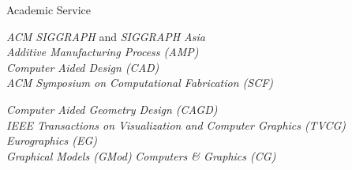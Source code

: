 \begin{rubric}{Academic Service}
\entry*[]
	\begin{minipage}[t]{0.48\textwidth}
		\textit{ACM SIGGRAPH} and \textit{SIGGRAPH Asia} \\
		\textit{Additive Manufacturing Process (AMP)} \\
		\textit{Computer Aided Design (CAD)} \\
		\textit{ACM Symposium on Computational Fabrication (SCF)} \\

	\end{minipage}
	\hfill
	\begin{minipage}[t]{0.48\textwidth}
		\textit{Computer Aided Geometry Design (CAGD)} \\
		\textit{IEEE Transactions on Visualization and Computer Graphics (TVCG)} \\
		\textit{Eurographics (EG)} \\
		\textit{Graphical Models (GMod)}
		\textit{Computers \& Graphics (CG)}
	\end{minipage}
\end{rubric}
